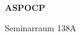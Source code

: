 \documentclass[a4paper]{article}
\begin{document}
\printGenericVSLHeader
\begin{center}
\begin{vsltext}{3cm}{4cm}

   \vspace{0.5cm} 

    \textbf{ASPOCP} 

    \vspace{1.5cm}

    Seminarraum 138A

\end{vsltext}

\end{center}
\end{document}
